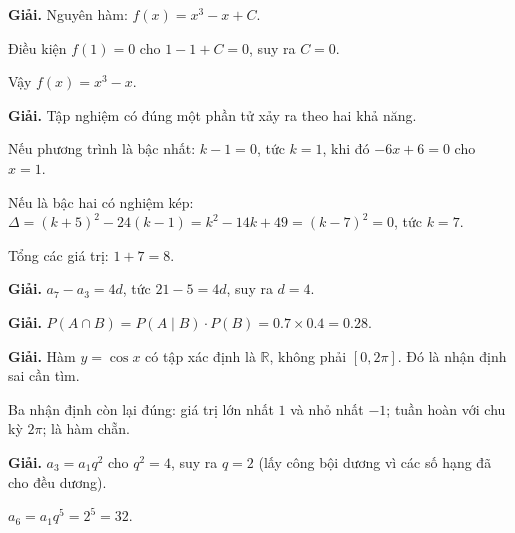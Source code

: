 \documentclass[11pt, a4paper]{article}
\begin{document}
\vspace{0.3cm}
\begin{dapan}[41 — Đáp án A]

\textbf{Giải.} Nguyên hàm: $f(x) = x^3 - x + C$.

Điều kiện $f(1) = 0$ cho $1 - 1 + C = 0$, suy ra $C = 0$.

Vậy $f(x) = x^3 - x$.


\end{dapan}
\vspace{0.3cm}
\begin{dapan}[42 — Đáp án B]

\textbf{Giải.} Tập nghiệm có đúng một phần tử xảy ra theo hai khả năng.

Nếu phương trình là bậc nhất: $k - 1 = 0$, tức $k = 1$, khi đó $-6x + 6 = 0$ cho $x = 1$.

Nếu là bậc hai có nghiệm kép: $\Delta = (k+5)^2 - 24(k-1) = k^2 - 14k + 49 = (k-7)^2 = 0$, tức $k = 7$.

Tổng các giá trị: $1 + 7 = 8$.


\end{dapan}
\vspace{0.3cm}
\begin{dapan}[43 — Đáp án B]

\textbf{Giải.} $a_7 - a_3 = 4d$, tức $21 - 5 = 4d$, suy ra $d = 4$.


\end{dapan}
\vspace{0.3cm}
\begin{dapan}[44 — Đáp án A]

\textbf{Giải.} $P(A \cap B) = P(A \mid B) \cdot P(B) = 0.7 \times 0.4 = 0.28$.


\end{dapan}
\vspace{0.3cm}
\begin{dapan}[45 — Đáp án D]

\textbf{Giải.} Hàm $y = \cos x$ có tập xác định là $\mathbb{R}$, không phải $[0, 2\pi]$. Đó là nhận định sai cần tìm.

Ba nhận định còn lại đúng: giá trị lớn nhất $1$ và nhỏ nhất $-1$; tuần hoàn với chu kỳ $2\pi$; là hàm chẵn.


\end{dapan}
\vspace{0.3cm}
\begin{dapan}[46 — Đáp án C]

\textbf{Giải.} $a_3 = a_1 q^2$ cho $q^2 = 4$, suy ra $q = 2$ (lấy công bội dương vì các số hạng đã cho đều dương).

$a_6 = a_1 q^5 = 2^5 = 32$.


\end{dapan}
\end{document}

